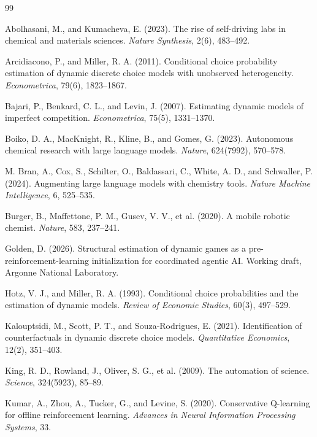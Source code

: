 \documentclass[11pt]{article}
\theoremstyle{definition}
\begin{document}
\begin{thebibliography}{99}

Abolhasani, M., and Kumacheva, E. (2023). The rise of self-driving labs in chemical and materials sciences. \emph{Nature Synthesis}, 2(6), 483--492.

Arcidiacono, P., and Miller, R. A. (2011). Conditional choice probability estimation of dynamic discrete choice models with unobserved heterogeneity. \emph{Econometrica}, 79(6), 1823--1867.

Bajari, P., Benkard, C. L., and Levin, J. (2007). Estimating dynamic models of imperfect competition. \emph{Econometrica}, 75(5), 1331--1370.

Boiko, D. A., MacKnight, R., Kline, B., and Gomes, G. (2023). Autonomous chemical research with large language models. \emph{Nature}, 624(7992), 570--578.

M. Bran, A., Cox, S., Schilter, O., Baldassari, C., White, A. D., and Schwaller, P. (2024). Augmenting large language models with chemistry tools. \emph{Nature Machine Intelligence}, 6, 525--535.

Burger, B., Maffettone, P. M., Gusev, V. V., et al. (2020). A mobile robotic chemist. \emph{Nature}, 583, 237--241.

Golden, D. (2026). Structural estimation of dynamic games as a pre-reinforcement-learning initialization for coordinated agentic AI. Working draft, Argonne National Laboratory.

Hotz, V. J., and Miller, R. A. (1993). Conditional choice probabilities and the estimation of dynamic models. \emph{Review of Economic Studies}, 60(3), 497--529.

Kalouptsidi, M., Scott, P. T., and Souza-Rodrigues, E. (2021). Identification of counterfactuals in dynamic discrete choice models. \emph{Quantitative Economics}, 12(2), 351--403.

King, R. D., Rowland, J., Oliver, S. G., et al. (2009). The automation of science. \emph{Science}, 324(5923), 85--89.

Kumar, A., Zhou, A., Tucker, G., and Levine, S. (2020). Conservative Q-learning for offline reinforcement learning. \emph{Advances in Neural Information Processing Systems}, 33.


\end{thebibliography}
\end{document}
